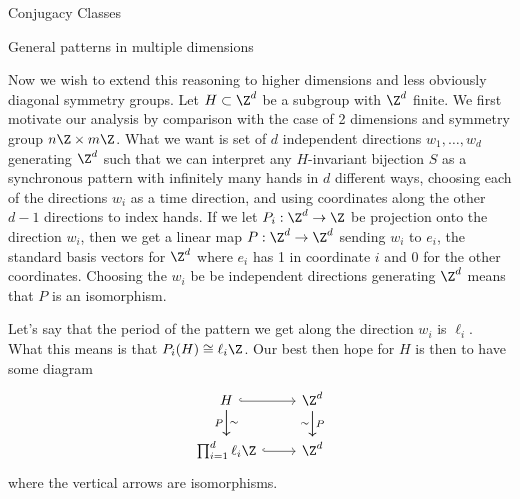 \documentclass[12nt]{article}
\theoremstyle{plain}
\begin{document}
\begin{subsection}{Conjugacy Classes}
\newpage
\begin{subsection}{General patterns in multiple dimensions}

Now we wish to extend this reasoning to higher dimensions and less obviously diagonal symmetry groups. Let $H \subset \Z^d$ be a subgroup with $\Z^d$ finite. We first motivate our analysis by comparison with the case of 2 dimensions and symmetry group $n\Z \times m\Z$. What we want is set of $d$ independent directions $w_1, \dots, w_d$ generating $\Z^d$ such that we can interpret any $H$-invariant bijection $S$ as a synchronous pattern with infinitely many hands in $d$ different ways, choosing each of the directions $w_i$ as a time direction, and using coordinates along the other $d - 1$ directions to index hands. If we let $P_i : \Z^d \to \Z$ be projection onto the direction $w_i$, then we get a linear map $P : \Z^d \to \Z^d$ sending $w_i$ to $e_i$, the standard basis vectors for $\Z^d$ where $e_i$ has 1 in coordinate $i$ and 0 for the other coordinates. Choosing the $w_i$ be be independent directions generating $\Z^d$ means that $P$ is an isomorphism. 

Let's say that the period of the pattern we get along the direction $w_i$ is $\ell_i$. What this means is that $P_i(H) \cong \ell_i \Z$. Our best then hope for $H$ is then to have some diagram
\[
\begin{tikzcd}
H \ar[r, hookrightarrow] \ar[d, "P"'] \ar[d, "\sim"] & \Z^d \ar[d, "P"] \ar[d, "\sim"']  \\
\prod_{i=1}^d \ell_i \Z \ar[r, hookrightarrow] & \Z^d
\end{tikzcd}
\]
where the vertical arrows are isomorphisms. 


\end{subsection}
\end{subsection}
\end{document}
